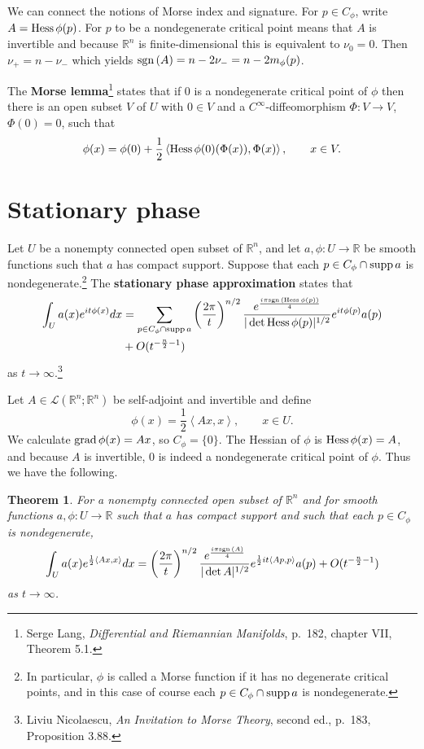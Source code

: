 \documentclass{article}
\newcommand{\inner}[2]{\left\langle #1, #2 \right\rangle}
\newcommand{\grad}{\ensuremath\mathrm{grad}\,}
\newcommand{\Hess}{\ensuremath\mathrm{Hess}\,}
\newcommand{\sgn}{\ensuremath\mathrm{sgn}\,}
\newcommand{\supp}{\ensuremath\mathrm{supp}\,}
\newtheorem{theorem}{Theorem}
\theoremstyle{definition}
\begin{document}
We can  connect the notions of Morse index and signature. For
$p \in C_\phi$, write $A=\Hess \phi(p)$. For $p$ to be a nondegenerate critical point means that $A$ is invertible and
 because $\mathbb{R}^n$ is finite-dimensional this is equivalent to
$\nu_0=0$. Then $\nu_+=n-\nu_-$ which yields $\sgn(A) = n-2\nu_-=n-2m_\phi(p)$. 


The \textbf{Morse lemma}\footnote{Serge Lang, {\em Differential and Riemannian Manifolds}, p.~182,
chapter VII, Theorem 5.1.} states that if $0$ is a nondegenerate critical point of $\phi$
then there is an open subset $V$ of $U$ with $0 \in V$ and a 
$C^\infty$-diffeomorphism $\Phi:V \to V$, $\Phi(0)=0$, such that 
\[
\phi(x) = \phi(0)+\frac{1}{2}\inner{\Hess \phi(0)(\Phi(x))}{\Phi(x)},\qquad x \in V.
\]



\section{Stationary phase}
Let $U$ be a nonempty connected open subset of $\mathbb{R}^n$, and
let $a,\phi:U \to \mathbb{R}$ be smooth functions such that $a$ has compact support. 
Suppose
that each $p \in C_\phi \cap \supp a$ is nondegenerate.\footnote{In particular, $\phi$ is called a Morse function if it has
no degenerate critical points, and in this case of course each $p \in C_\phi \cap \supp a$ is nondegenerate.} 
The \textbf{stationary phase approximation} states that
\begin{align*}
\int_U a(x) e^{it\phi(x)} dx &= \sum_{p \in C_\phi \cap \supp a} 
\left( \frac{2\pi}{t}\right)^{n/2} \frac{e^{\frac{i\pi \sgn(\Hess \phi(p))}{4}}}{|\det \Hess \phi(p)|^{1/2}}
e^{it\phi(p)} a(p)\\
&+ O(t^{-\frac{n}{2}-1})
\end{align*}
as $t \to \infty$.\footnote{Liviu Nicolaescu, {\em An Invitation to Morse Theory}, second ed.,
p.~183, Proposition 3.88.}


Let $A \in \mathscr{L}(\mathbb{R}^n;\mathbb{R}^n)$ be self-adjoint and invertible and define
\[
\phi(x) = \frac{1}{2}\inner{Ax}{x},\qquad x \in U.
\]
We calculate $\grad \phi(x) = Ax$,
so $C_\phi = \{0\}$. 
The Hessian of $\phi$ is
 $\Hess \phi(x) = A$, and because $A$ is invertible, $0$ is indeed a nondegenerate critical point of $\phi$. 
Thus we have the following.

\begin{theorem}
For a nonempty connected open subset of $\mathbb{R}^n$ and for smooth functions $a,\phi:U \to \mathbb{R}$
such that $a$ has compact support and such that each $p \in C_\phi$ is nondegenerate,
\[
\int_U a(x) e^{\frac{1}{2}\inner{Ax}{x}} dx = \left( \frac{2\pi}{t}\right)^{n/2} 
\frac{e^{\frac{i\pi\sgn(A)}{4}}}{|\det A|^{1/2}}
e^{\frac{1}{2}it\inner{Ap}{p}} a(p) + O(t^{-\frac{n}{2}-1})
\]
as $t \to \infty$. 
\end{theorem}
\end{document}
